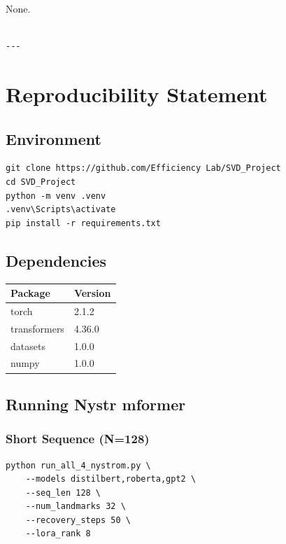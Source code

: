 None.
\begin{lstlisting}

---
\end{lstlisting}


\section{Reproducibility Statement}

\subsection{Environment}

\begin{lstlisting}
git clone https://github.com/Efficiency Lab/SVD_Project
cd SVD_Project
python -m venv .venv
.venv\Scripts\activate
pip install -r requirements.txt
\end{lstlisting}

\subsection{Dependencies}

\begin{table}[H]
\centering
\small
\begin{tabular}{ll}
\toprule
\textbf{Package} & \textbf{Version} \\
\midrule
torch & 2.1.2 \\
transformers & 4.36.0 \\
datasets & 1.0.0 \\
numpy & 1.0.0 \\
\bottomrule
\end{tabular}
\end{table}

\subsection{Running Nystr mformer}

\subsubsection{Short Sequence (N=128)}

\begin{lstlisting}
python run_all_4_nystrom.py \
    --models distilbert,roberta,gpt2 \
    --seq_len 128 \
    --num_landmarks 32 \
    --recovery_steps 50 \
    --lora_rank 8
\end{lstlisting}

